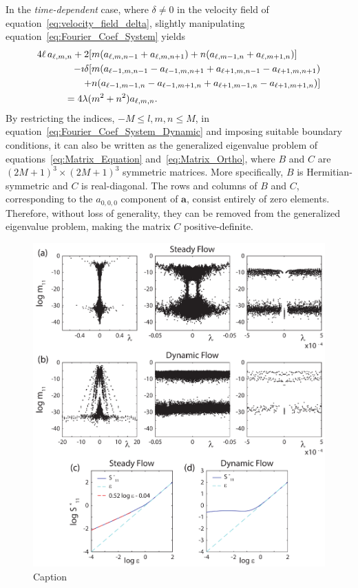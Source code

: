 \documentclass[leqno,onefignum,onetabnum]{siamltex1213}
\newcommand{\veca}{\boldsymbol{a}}
\begin{document}
In the \emph{time-dependent} case, where $\delta\neq0$ in the velocity field
of equation~\eqref{eq:velocity_field_delta}, slightly manipulating
equation~\eqref{eq:Fourier_Coef_System} yields  
%
\begin{align}\label{eq:Fourier_Coef_System_Dynamic}
4\ell\,a_{\ell,m,n}
+2[&m(a_{\ell,m,n-1}+a_{\ell,m,n+1})+n(a_{\ell,m-1,n}+a_{\ell,m+1,n})]
\notag\\
-\imath\delta[&m(a_{\ell-1,m,n-1}-a_{\ell-1,m,n+1}+a_{\ell+1,m,n-1}-a_{\ell+1,m,n+1})\notag\\
    +&n(a_{\ell-1,m-1,n}-a_{\ell-1,m+1,n}+a_{\ell+1,m-1,n}-a_{\ell+1,m+1,n})] 
\notag\\
=4\lambda(&m^2+n^2)a_{\ell,m,n}.
\end{align}
%
By restricting the indices, $-M\leq l,m,n\leq M$, in
equation~\eqref{eq:Fourier_Coef_System_Dynamic} and imposing suitable
boundary  
conditions, it can also be
written as the generalized eigenvalue problem of
equations~\eqref{eq:Matrix_Equation} and~\eqref{eq:Matrix_Ortho},
where  $B$ and 
$C$ are $(2M+1)^3\times(2M+1)^3$ symmetric matrices. More specifically,
$B$ is Hermitian-symmetric and $C$ is real-diagonal. The rows and
columns of $B$ and $C$, corresponding to the $a_{0,0,0}$ component of
$\veca$, consist entirely of zero elements. Therefore, without loss
of generality, they can be removed from the generalized eigenvalue
problem, making the matrix $C$ positive-definite.  

%
\begin{figure}[t]
  \centerline{\includegraphics[scale=0.75]{Figure1_Spectral_Measures_Effective_Diffusivities.eps}} 
\caption{%
  Caption
        }
\label{fig:Fig1_Spect_Meas_Eff_Diffus}
\end{figure}
%
\end{document}
